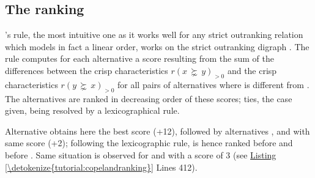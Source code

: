 \documentclass[a4paper,12pt,english]{sphinxhowto}
\begin{document}
\subsection{The  ranking}
\label{\detokenize{tutorial:the-copeland-ranking}}\label{\detokenize{tutorial:copeland-ranking-label}}
’s rule, the most intuitive one as it works well for any strict outranking relation which models in fact a linear order, works on the  strict outranking digraph . The rule computes for each alternative a score resulting from the sum of the differences between the crisp  characteristics \(r(x\, \succnsim \,y)_{>0}\) and the crisp  characteristics \(r(y\, \succnsim \, x)_{>0}\)  for all pairs of alternatives where  is different from . The alternatives are ranked in decreasing order of these  scores; ties, the case given, being resolved by a lexicographical rule.
\def\sphinxLiteralBlockLabel{\label{\detokenize{tutorial:copelandranking}}}
\begin{sphinxVerbatim}[commandchars=\\\{\},numbers=left,firstnumber=1,stepnumber=1]
   
  
\end{sphinxVerbatim}

Alternative  obtains here the best  score (+12), followed by alternatives ,  and  with same score (+2); following the lexicographic rule,  is hence ranked before  and  before . Same situation is observed for  and  with a score of \sphinxhyphen{}3 (see \hyperref[\detokenize{tutorial:copelandranking}]{Listing \ref{\detokenize{tutorial:copelandranking}}} Lines 4\sphinxhyphen{}12).
\end{document}
